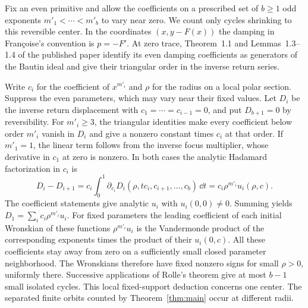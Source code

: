 \begin{remark}\label{rem:local-cyclicity}
Fix an even primitive and allow the coefficients on a prescribed
set of $b\ge1$ odd exponents $m'_1<\cdots<m'_b$ to vary near zero.
We count only cycles shrinking to this reversible center. In the
coordinates $(x,y-F(x))$ the damping in Fran\c{c}oise's convention
is $p=-F'$. At zero trace, Theorem~1.1 and Lemmas~1.3--1.4 of the
published paper \cite[pp.~257--259]{Francoise} identify its even
damping coefficients as generators of the Bautin ideal and give
their triangular order in the inverse return series.

Write $c_i$ for the coefficient of $x^{m'_i}$ and $\rho$ for the
radius on a local polar section. Suppress the even parameters, which
may vary near their fixed values. Let $D_i$ be the inverse return
displacement with $c_1=\cdots=c_{i-1}=0$, and put $D_{b+1}=0$
by reversibility. For $m'_i\ge3$, the triangular identities make
every coefficient below order $m'_i$ vanish in $D_i$ and give a
nonzero constant times $c_i$ at that order. If $m'_1=1$, the linear
term follows from the inverse focus multiplier, whose derivative in
$c_1$ at zero is nonzero. In both cases the analytic Hadamard
factorization in $c_i$ is
\[
 D_i-D_{i+1}
 =c_i\int_0^1\partial_{c_i}D_i(\rho,t c_i,c_{i+1},\ldots,c_b)\,\dd t
 =c_i\rho^{m'_i}u_i(\rho,c).
\]
The coefficient statements give analytic $u_i$ with $u_i(0,0)\ne0$.
Summing yields $D_1=\sum_i c_i\rho^{m'_i}u_i$. For fixed parameters
the leading coefficient of each initial Wronskian of these functions
$\rho^{m'_i}u_i$ is the Vandermonde product of the corresponding
exponents times the product of their $u_i(0,c)$. All these coefficients
stay away from zero on a sufficiently small closed parameter
neighborhood. The Wronskians therefore have fixed nonzero signs for
small $\rho>0$, uniformly there. Successive applications of Rolle's
theorem give at most $b-1$ small isolated cycles. This local
fixed-support deduction concerns one center. The separated finite
orbits counted by Theorem~\ref{thm:main} occur at different radii.
\end{remark}
